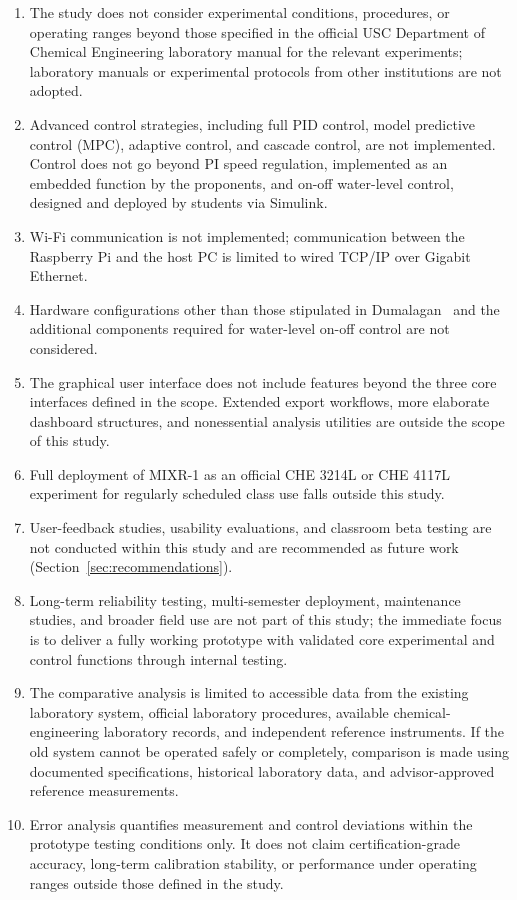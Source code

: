 \begin{enumerate}
    \item The study does not consider experimental conditions, procedures, or operating ranges beyond those specified in the official USC Department of Chemical Engineering laboratory manual for the relevant experiments; laboratory manuals or experimental protocols from other institutions are not adopted.
    \item Advanced control strategies, including full PID control, model predictive control (MPC), adaptive control, and cascade control, are not implemented. Control does not go beyond PI speed regulation, implemented as an embedded function by the proponents, and on-off water-level control, designed and deployed by students via Simulink.
    \item Wi-Fi communication is not implemented; communication between the Raspberry Pi and the host PC is limited to wired TCP/IP over Gigabit Ethernet.
    \item Hardware configurations other than those stipulated in Dumalagan~\citep{dumalagan2024} and the additional components required for water-level on-off control are not considered.
    \item The graphical user interface does not include features beyond the three core interfaces defined in the scope. Extended export workflows, more elaborate dashboard structures, and nonessential analysis utilities are outside the scope of this study.
    \item Full deployment of MIXR-1 as an official CHE 3214L or CHE 4117L experiment for regularly scheduled class use falls outside this study.
    \item User-feedback studies, usability evaluations, and classroom beta testing are not conducted within this study and are recommended as future work (Section~\ref{sec:recommendations}).
    \item Long-term reliability testing, multi-semester deployment, maintenance studies, and broader field use are not part of this study; the immediate focus is to deliver a fully working prototype with validated core experimental and control functions through internal testing.
    \item The comparative analysis is limited to accessible data from the existing laboratory system, official laboratory procedures, available chemical-engineering laboratory records, and independent reference instruments. If the old system cannot be operated safely or completely, comparison is made using documented specifications, historical laboratory data, and advisor-approved reference measurements.
    \item Error analysis quantifies measurement and control deviations within the prototype testing conditions only. It does not claim certification-grade accuracy, long-term calibration stability, or performance under operating ranges outside those defined in the study.
\end{enumerate}

